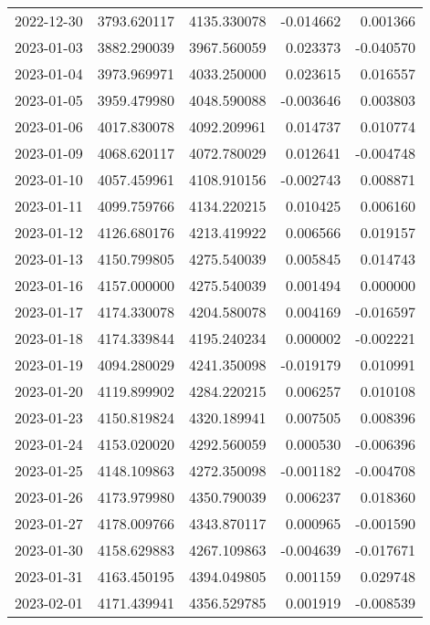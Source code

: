 \begin{tabular}{lrrrr}
2022-12-30 & 3793.620117 & 4135.330078 &       -0.014662 &     0.001366 \\
2023-01-03 & 3882.290039 & 3967.560059 &        0.023373 &    -0.040570 \\
2023-01-04 & 3973.969971 & 4033.250000 &        0.023615 &     0.016557 \\
2023-01-05 & 3959.479980 & 4048.590088 &       -0.003646 &     0.003803 \\
2023-01-06 & 4017.830078 & 4092.209961 &        0.014737 &     0.010774 \\
2023-01-09 & 4068.620117 & 4072.780029 &        0.012641 &    -0.004748 \\
2023-01-10 & 4057.459961 & 4108.910156 &       -0.002743 &     0.008871 \\
2023-01-11 & 4099.759766 & 4134.220215 &        0.010425 &     0.006160 \\
2023-01-12 & 4126.680176 & 4213.419922 &        0.006566 &     0.019157 \\
2023-01-13 & 4150.799805 & 4275.540039 &        0.005845 &     0.014743 \\
2023-01-16 & 4157.000000 & 4275.540039 &        0.001494 &     0.000000 \\
2023-01-17 & 4174.330078 & 4204.580078 &        0.004169 &    -0.016597 \\
2023-01-18 & 4174.339844 & 4195.240234 &        0.000002 &    -0.002221 \\
2023-01-19 & 4094.280029 & 4241.350098 &       -0.019179 &     0.010991 \\
2023-01-20 & 4119.899902 & 4284.220215 &        0.006257 &     0.010108 \\
2023-01-23 & 4150.819824 & 4320.189941 &        0.007505 &     0.008396 \\
2023-01-24 & 4153.020020 & 4292.560059 &        0.000530 &    -0.006396 \\
2023-01-25 & 4148.109863 & 4272.350098 &       -0.001182 &    -0.004708 \\
2023-01-26 & 4173.979980 & 4350.790039 &        0.006237 &     0.018360 \\
2023-01-27 & 4178.009766 & 4343.870117 &        0.000965 &    -0.001590 \\
2023-01-30 & 4158.629883 & 4267.109863 &       -0.004639 &    -0.017671 \\
2023-01-31 & 4163.450195 & 4394.049805 &        0.001159 &     0.029748 \\
2023-02-01 & 4171.439941 & 4356.529785 &        0.001919 &    -0.008539 \\

\end{tabular}
